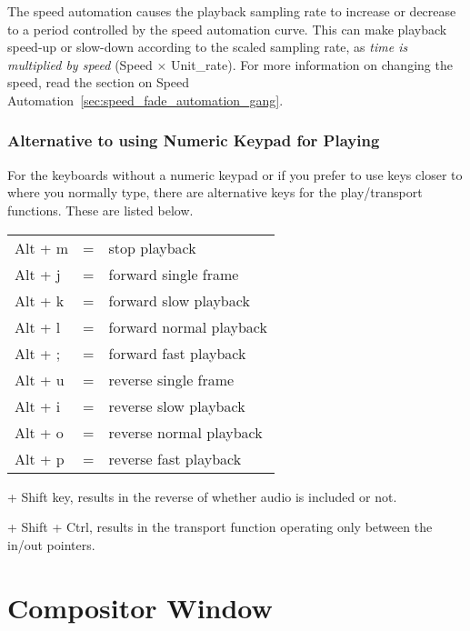 The speed automation causes the playback sampling rate to increase or decrease to a period controlled by the speed automation curve.  
This can make playback speed-up or slow-down according to the scaled sampling rate, as \textit{time is multiplied by speed} (Speed $\times$ Unit\_rate). For more information on changing
the speed, read the section on Speed Automation~\ref{sec:speed_fade_automation_gang}.

\subsubsection*{Alternative to using Numeric Keypad for Playing}%
\label{ssub:alternative_to_using_numeric_keypad_for_playing}


For the keyboards without a numeric keypad or if you prefer to use keys closer to where you normally type, there are alternative keys for the play/transport functions.  These are listed below.

\begin{tabular}{lcl}
	Alt + m&=&stop playback\\

	Alt + j&=&forward single frame\\

	Alt + k&=&forward slow playback\\

	Alt + l&=&forward normal playback\\

	Alt + ;&=&forward fast playback\\

	Alt + u&=&reverse single frame\\

	Alt + i&=&reverse slow playback\\

	Alt + o&=&reverse normal playback\\

	Alt + p&=&reverse fast playback\\
\end{tabular}
\begin{minipage}{.45\linewidth}
+ Shift key, results in the reverse of whether audio is included or not.
\vspace{1ex}

+ Shift + Ctrl, results in the transport function operating only between the in/out pointers.
\end{minipage}

\section{Compositor Window}%
\label{sec:compositor_window}

